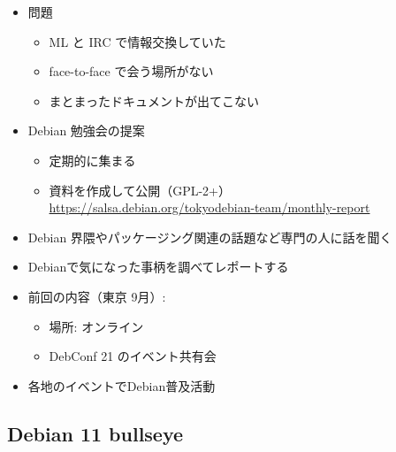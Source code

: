 \documentclass[mingoth,a4paper]{jsarticle}
\begin{document}


\begin{itemize}
\item 問題
  \begin{itemize}
  \item ML と IRC で情報交換していた
  \item face-to-face で会う場所がない
  \item まとまったドキュメントが出てこない
  \end{itemize}
\item Debian 勉強会の提案
  \begin{itemize}
  \item 定期的に集まる
  \item 資料を作成して公開（GPL-2+） \\
	{\small \url{https://salsa.debian.org/tokyodebian-team/monthly-report}}
  \end{itemize}
\end{itemize}


  
\begin{itemize}
\item Debian 界隈やパッケージング関連の話題など専門の人に話を聞く
\item Debianで気になった事柄を調べてレポートする
\item 前回の内容（東京 9月）:
  \begin{itemize}
  \item 場所: オンライン
  \item DebConf 21 のイベント共有会
  \end{itemize}
\item 各地のイベントでDebian普及活動
\end{itemize}


\subsection{Debian 11 bullseye}

\end{document}
